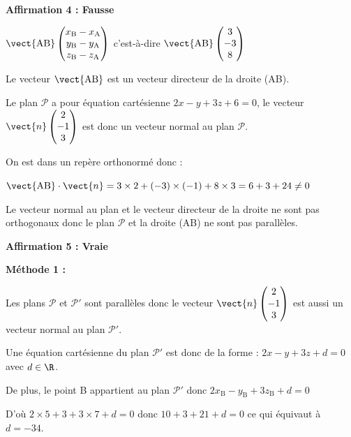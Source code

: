 \textbf{Affirmation 4 : Fausse}

\smallskip

$\vect{\mathrm{AB}}\begin{pmatrix}x_\mathrm{B} -x_\mathrm{A} \\ y_\mathrm{B}-y_\mathrm{A}\\z_\mathrm{B}-z_\mathrm{A}\end{pmatrix}$ c'est-à-dire $\vect{\mathrm{AB}}\begin{pmatrix}3 \\ -3\\8\end{pmatrix}$

Le vecteur $\vect{\mathrm{AB}}$ est un vecteur directeur de la droite (AB).

 Le plan $\mathcal{P}$ a pour équation cartésienne $2x - y + 3z + 6 = 0$, le vecteur $\vect{n}\begin{pmatrix}2\\-1\\3\end{pmatrix}$ est donc un vecteur normal au plan $\mathcal{P}$.

On est dans un repère orthonormé donc :

$\vect{\mathrm{AB}} \cdot \vect{n}= 3 \times 2 + (-3) \times (-1) + 8 \times 3 = 6+3+24 \neq 0$

Le vecteur normal au plan et le vecteur directeur de la droite ne sont pas orthogonaux donc le plan $\mathcal{P}$ et la droite (AB) ne sont pas parallèles.

\textbf{Affirmation 5 : Vraie}

\smallskip

\textbf{Méthode 1 :}

Les plans $\mathcal{P}$ et $\mathcal{P}'$ sont parallèles donc le vecteur $\vect{n}\begin{pmatrix}2\\-1\\3\end{pmatrix}$ est aussi un vecteur normal au plan $\mathcal{P}'$.

Une équation cartésienne du plan $\mathcal{P}'$ est donc de la forme : $2x - y +3z + d = 0$ avec $d\in \R$.

De plus, le point B appartient au plan $\mathcal{P}'$ donc $2x_{\mathrm{B}} - y_{\mathrm{B}} +3z_{\mathrm{B}} + d= 0$

D'où $2 \times 5 +3 +3 \times 7 +d=0$ donc $10+3+21+d = 0$ ce qui équivaut à $d=-34 $.


